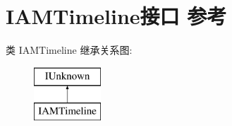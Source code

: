 \hypertarget{interface_i_a_m_timeline}{}\section{I\+A\+M\+Timeline接口 参考}
\label{interface_i_a_m_timeline}
类 I\+A\+M\+Timeline 继承关系图\+:\begin{figure}[H]
\begin{center}
\leavevmode
\includegraphics[height=2.000000cm]{interface_i_a_m_timeline}
\end{center}
\end{figure}
